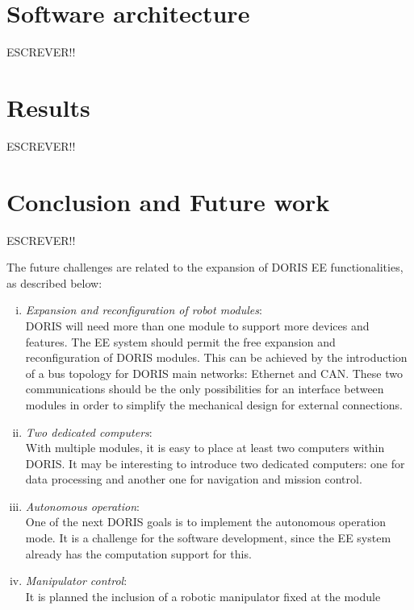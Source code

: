 \documentclass{ifacconf}
\begin{document}
\section{Software architecture}\label{sec:software_overview}
ESCREVER!!
\section{Results}\label{sec:results}
ESCREVER!!
\section{Conclusion and Future work}\label{sec:conclusions}
ESCREVER!!

The future challenges are related to the expansion of DORIS EE functionalities,
as described below:
\begin{enumerate}[i)]
  \item \emph{Expansion and reconfiguration of robot modules}:\\
  \newline
  DORIS will need more than one module to support more devices and features.
  The EE system should permit the free expansion and reconfiguration of DORIS
  modules. This can be achieved by the introduction of a bus topology for DORIS
  main networks: Ethernet and CAN. These two communications should be the only
  possibilities for an interface between modules in order to simplify the
  mechanical design for external connections.\\
  \item \emph{Two dedicated computers}:\\
  \newline
  With multiple modules, it is easy to place at least two computers within
  DORIS. It may be interesting to introduce two dedicated computers:  one for
  data processing and another one for navigation and mission control.\\
  \item \emph{Autonomous operation}:\\
  \newline
  One of the next DORIS goals is to implement the autonomous operation mode. It
  is a challenge for the software development, since the EE system already has
  the computation support for this.\\
  \item \emph{Manipulator control}:\\
  \newline
  It is planned the inclusion of a robotic manipulator fixed at the module

\end{enumerate}
\end{document}
